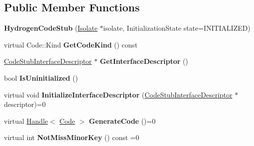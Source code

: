 \subsection*{Public Member Functions}
\begin{DoxyCompactItemize}
\item 
\hypertarget{classv8_1_1internal_1_1_hydrogen_code_stub_a7866dc5b5599a7898b5d1ee2d924e557}{}{\bfseries Hydrogen\+Code\+Stub} (\hyperlink{classv8_1_1internal_1_1_isolate}{Isolate} $\ast$isolate, Initialization\+State state=I\+N\+I\+T\+I\+A\+L\+I\+Z\+E\+D)\label{classv8_1_1internal_1_1_hydrogen_code_stub_a7866dc5b5599a7898b5d1ee2d924e557}

\item 
\hypertarget{classv8_1_1internal_1_1_hydrogen_code_stub_ac6306c6951dafe84bcb4bc8df8aac760}{}virtual Code\+::\+Kind {\bfseries Get\+Code\+Kind} () const \label{classv8_1_1internal_1_1_hydrogen_code_stub_ac6306c6951dafe84bcb4bc8df8aac760}

\item 
\hypertarget{classv8_1_1internal_1_1_hydrogen_code_stub_aa4b55e03ffee53cbfb819bdb175f1ae9}{}\hyperlink{classv8_1_1internal_1_1_code_stub_interface_descriptor}{Code\+Stub\+Interface\+Descriptor} $\ast$ {\bfseries Get\+Interface\+Descriptor} ()\label{classv8_1_1internal_1_1_hydrogen_code_stub_aa4b55e03ffee53cbfb819bdb175f1ae9}

\item 
\hypertarget{classv8_1_1internal_1_1_hydrogen_code_stub_afb9dea2db7f45f1d26f4ae13a8a8c893}{}bool {\bfseries Is\+Uninitialized} ()\label{classv8_1_1internal_1_1_hydrogen_code_stub_afb9dea2db7f45f1d26f4ae13a8a8c893}

\item 
\hypertarget{classv8_1_1internal_1_1_hydrogen_code_stub_a5e0e16335e37a536ff1fb29b78dbaf95}{}virtual void {\bfseries Initialize\+Interface\+Descriptor} (\hyperlink{classv8_1_1internal_1_1_code_stub_interface_descriptor}{Code\+Stub\+Interface\+Descriptor} $\ast$descriptor)=0\label{classv8_1_1internal_1_1_hydrogen_code_stub_a5e0e16335e37a536ff1fb29b78dbaf95}

\item 
\hypertarget{classv8_1_1internal_1_1_hydrogen_code_stub_a32998a2936674f69fb01bdc6d1fd3258}{}virtual \hyperlink{classv8_1_1internal_1_1_handle}{Handle}$<$ \hyperlink{classv8_1_1internal_1_1_code}{Code} $>$ {\bfseries Generate\+Code} ()=0\label{classv8_1_1internal_1_1_hydrogen_code_stub_a32998a2936674f69fb01bdc6d1fd3258}

\item 
\hypertarget{classv8_1_1internal_1_1_hydrogen_code_stub_aa497adb5445b7bc412971330f9cae5a0}{}virtual int {\bfseries Not\+Miss\+Minor\+Key} () const =0\label{classv8_1_1internal_1_1_hydrogen_code_stub_aa497adb5445b7bc412971330f9cae5a0}


\end{DoxyCompactItemize}
